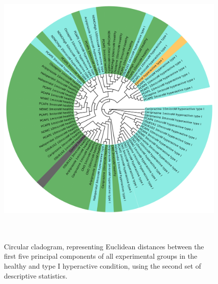 \documentclass[a4paper,12pt]{article}
\begin{document}
\begin{figure}[h!]
\begin{center}
\includegraphics[width=14cm,height=14cm]{DarkApoHigh_set2_PCA_tree_A.png}
\caption{Circular cladogram, representing Euclidean distances between the first five principal components of all experimental groups in the healthy and type I hyperactive condition, using the second set of descriptive statistics.}
\end{center}
\end{figure}
\newpage
\end{document}
